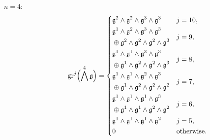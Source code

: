 \begin{description}
  \item[$n=4:$]
        \begin{equation*}
          \operatorname{gr}^{j}\Bigl( \bigwedge^{4}\mathfrak{g} \Bigr) =
          \begin{dcases}
            \mathfrak{g}^{2} \wedge \mathfrak{g}^{2} \wedge \mathfrak{g}^{3} \wedge \mathfrak{g}^{3} & j=10,                                                                                                                   \\
            \!\begin{aligned} & \mathfrak{g}^{1} \wedge \mathfrak{g}^{2} \wedge \mathfrak{g}^{3} \wedge \mathfrak{g}^{3} \\ & \oplus \mathfrak{g}^{2} \wedge \mathfrak{g}^{2} \wedge \mathfrak{g}^{2} \wedge \mathfrak{g}^{3} \end{aligned} & j=9, \\
            \!\begin{aligned} & \mathfrak{g}^{1} \wedge \mathfrak{g}^{1} \wedge \mathfrak{g}^{3} \wedge \mathfrak{g}^{3} \\ & \oplus \mathfrak{g}^{1} \wedge \mathfrak{g}^{2} \wedge \mathfrak{g}^{2} \wedge \mathfrak{g}^{3} \end{aligned} & j=8, \\
            \!\begin{aligned} & \mathfrak{g}^{1} \wedge \mathfrak{g}^{1} \wedge \mathfrak{g}^{2} \wedge \mathfrak{g}^{3} \\ & \oplus \mathfrak{g}^{1} \wedge \mathfrak{g}^{2} \wedge \mathfrak{g}^{2} \wedge \mathfrak{g}^{2} \end{aligned} & j=7, \\
            \!\begin{aligned} & \mathfrak{g}^{1} \wedge \mathfrak{g}^{1} \wedge \mathfrak{g}^{1} \wedge \mathfrak{g}^{3} \\ & \oplus \mathfrak{g}^{1} \wedge \mathfrak{g}^{1} \wedge \mathfrak{g}^{2} \wedge \mathfrak{g}^{2} \end{aligned} & j=6, \\
            \mathfrak{g}^{1} \wedge \mathfrak{g}^{1} \wedge \mathfrak{g}^{1} \wedge \mathfrak{g}^{2}                                                                                                                  & j=5, \\
            0                                                                                                                                                                                   & \text{otherwise.}
          \end{dcases}
        \end{equation*}


\end{description}
